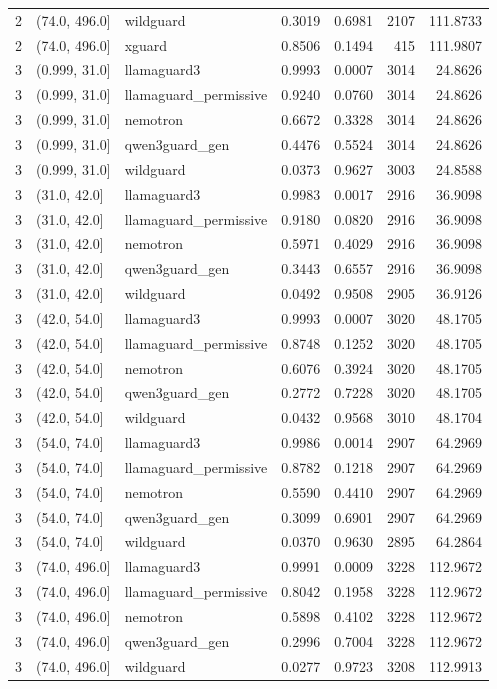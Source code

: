 \begin{tabular}{rllrrrr}
2 & (74.0, 496.0] & wildguard & 0.3019 & 0.6981 & 2107 & 111.8733 \\
2 & (74.0, 496.0] & xguard & 0.8506 & 0.1494 & 415 & 111.9807 \\
3 & (0.999, 31.0] & llamaguard3 & 0.9993 & 0.0007 & 3014 & 24.8626 \\
3 & (0.999, 31.0] & llamaguard\_permissive & 0.9240 & 0.0760 & 3014 & 24.8626 \\
3 & (0.999, 31.0] & nemotron & 0.6672 & 0.3328 & 3014 & 24.8626 \\
3 & (0.999, 31.0] & qwen3guard\_gen & 0.4476 & 0.5524 & 3014 & 24.8626 \\
3 & (0.999, 31.0] & wildguard & 0.0373 & 0.9627 & 3003 & 24.8588 \\
3 & (31.0, 42.0] & llamaguard3 & 0.9983 & 0.0017 & 2916 & 36.9098 \\
3 & (31.0, 42.0] & llamaguard\_permissive & 0.9180 & 0.0820 & 2916 & 36.9098 \\
3 & (31.0, 42.0] & nemotron & 0.5971 & 0.4029 & 2916 & 36.9098 \\
3 & (31.0, 42.0] & qwen3guard\_gen & 0.3443 & 0.6557 & 2916 & 36.9098 \\
3 & (31.0, 42.0] & wildguard & 0.0492 & 0.9508 & 2905 & 36.9126 \\
3 & (42.0, 54.0] & llamaguard3 & 0.9993 & 0.0007 & 3020 & 48.1705 \\
3 & (42.0, 54.0] & llamaguard\_permissive & 0.8748 & 0.1252 & 3020 & 48.1705 \\
3 & (42.0, 54.0] & nemotron & 0.6076 & 0.3924 & 3020 & 48.1705 \\
3 & (42.0, 54.0] & qwen3guard\_gen & 0.2772 & 0.7228 & 3020 & 48.1705 \\
3 & (42.0, 54.0] & wildguard & 0.0432 & 0.9568 & 3010 & 48.1704 \\
3 & (54.0, 74.0] & llamaguard3 & 0.9986 & 0.0014 & 2907 & 64.2969 \\
3 & (54.0, 74.0] & llamaguard\_permissive & 0.8782 & 0.1218 & 2907 & 64.2969 \\
3 & (54.0, 74.0] & nemotron & 0.5590 & 0.4410 & 2907 & 64.2969 \\
3 & (54.0, 74.0] & qwen3guard\_gen & 0.3099 & 0.6901 & 2907 & 64.2969 \\
3 & (54.0, 74.0] & wildguard & 0.0370 & 0.9630 & 2895 & 64.2864 \\
3 & (74.0, 496.0] & llamaguard3 & 0.9991 & 0.0009 & 3228 & 112.9672 \\
3 & (74.0, 496.0] & llamaguard\_permissive & 0.8042 & 0.1958 & 3228 & 112.9672 \\
3 & (74.0, 496.0] & nemotron & 0.5898 & 0.4102 & 3228 & 112.9672 \\
3 & (74.0, 496.0] & qwen3guard\_gen & 0.2996 & 0.7004 & 3228 & 112.9672 \\
3 & (74.0, 496.0] & wildguard & 0.0277 & 0.9723 & 3208 & 112.9913 \\
\bottomrule
\end{tabular}
